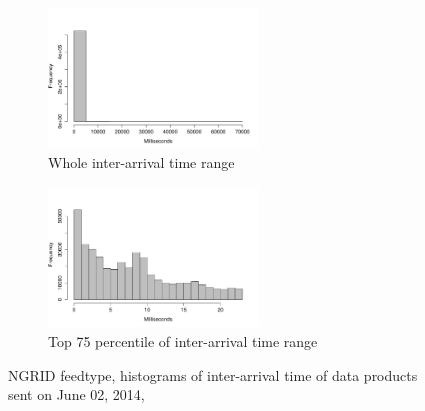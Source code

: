 \begin{figure}[htb!]
\centering
    \begin{subfigure}{0.5\linewidth}
        \centering
        \includegraphics[width=2.2in]{figures/Inter-hist-NGRID0602.pdf}
        \caption{Whole inter-arrival time range}
        \label{NGRID_Inter_Whole}
    \end{subfigure}\hfill
    \begin{subfigure}{0.5\linewidth}
	\centering
    \includegraphics[width=2.2in]{figures/Inter-hist-NGRID0602-TOP75.pdf}
        \caption{Top 75 percentile of inter-arrival time range}
        \label{NGRID_Inter_75}
    \end{subfigure}\hfill
    \caption{NGRID feedtype, histograms of inter-arrival time of data products sent on June 02, 2014, }
    \label{NG_time}
\end{figure}

